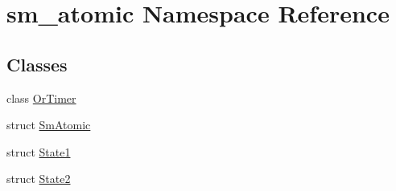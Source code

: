 \hypertarget{namespacesm__atomic}{}\section{sm\+\_\+atomic Namespace Reference}
\label{namespacesm__atomic}
\subsection*{Classes}
\begin{DoxyCompactItemize}
\item 
class \hyperlink{classsm__atomic_1_1OrTimer}{Or\+Timer}
\item 
struct \hyperlink{structsm__atomic_1_1SmAtomic}{Sm\+Atomic}
\item 
struct \hyperlink{structsm__atomic_1_1State1}{State1}
\item 
struct \hyperlink{structsm__atomic_1_1State2}{State2}
\end{DoxyCompactItemize}
